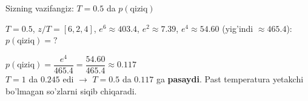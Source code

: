 \documentclass[aspectratio=169,11pt]{beamer}
\begin{document}
\begin{frame}{Sizning vazifangiz: $T=0.5$ da $p(\text{qiziq})$}
  \begin{tcolorbox}[warnbox,title=Savol --- 90 soniya]
    \small
    $T=0.5$, $z/T=[6,2,4]$, $e^6\approx 403.4$, $e^2\approx 7.39$, $e^4\approx 54.60$
    (yig'indi $\approx 465.4$):\\[4pt]
    \textbf{\large $p(\text{qiziq}) = ?$}
  \end{tcolorbox}
  \pause
  \begin{tcolorbox}[okbox,title=Javob]
    \small
    $p(\text{qiziq}) = \dfrac{e^4}{465.4} = \dfrac{54.60}{465.4} \approx \mathbf{0.117}$\\[3pt]
    \footnotesize $T{=}1$ da $0.245$ edi $\to$ $T{=}0.5$ da $0.117$ ga
    \textbf{pasaydi}. Past temperatura yetakchi bo'lmagan so'zlarni siqib chiqaradi.
  \end{tcolorbox}
\end{frame}
\end{document}
